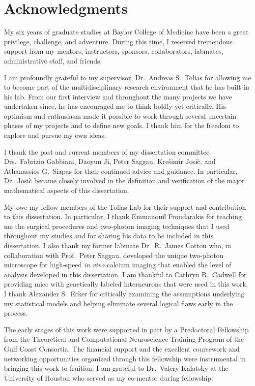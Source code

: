 \documentclass[12pt,twoside,openright]{report}
\begin{document}
\section*{Acknowledgments}
My six years of graduate studies at Baylor College of Medicine have been a great privilege, challenge, and adventure. During this time, I received tremendous support from my mentors, instructors, sponsors, collaborators, labmates, administrative staff, and friends.

I am profoundly grateful to my supervisor, Dr.\ Andreas S.\ Tolias for allowing me to become part of the multidisciplinary research environment that he has built in his lab. From our first interview and throughout the many projects we have undertaken since, he has encouraged me to think boldly yet critically.  His optimism and enthusiasm made it possible to work through several uncertain phases of my projects and to define new goals.  I thank him for the freedom to explore and pursue my own ideas.

I thank the past and current members of my dissertation committee Drs.\ Fabrizio Gabbiani, Daoyun Ji, Peter Saggau, Kre\v{s}imir Josi\`c, and Athanassios G.\ Siapas  for their continued advice and guidance. In particular, Dr.\ Josi\`c became closely involved in the definition and verification of the major mathematical aspects of this dissertation. 

My owe my fellow members of the Tolias Lab for their support and contribution to this dissertation.  In particular, I thank Emmanouil Froudarakis for teaching me the surgical procedures and two-photon imaging techniques that I used throughout my studies and for sharing his data to be included in this dissertation. I also thank my former labmate Dr.\ R.\ James Cotton who, in collaboration with Prof.~Peter Saggau, developed the unique two-photon microscope for high-speed \emph{in vivo} calcium imaging that enabled the level of analysis developed in this dissertation. I am thankful to Cathryn R.\ Cadwell for providing mice with genetically labeled interneurons that were used in this work. I thank Alexander S.\ Ecker for critically examining the assumptions underlying my statistical models and helping eliminate several logical flaws early in the process. 

The early stages of this  work were supported in part by a Predoctoral Fellowship from the Theoretical and Computational Neuroscience Training Program of the Gulf Coast Consortia.  The financial support and the excellent coursework and networking opportunities organized through this fellowship were instrumental in bringing this work to fruition. I am grateful to Dr.\ Valery Kalatsky at the University of Houston who served as my co-mentor during fellowship.
\end{document}
